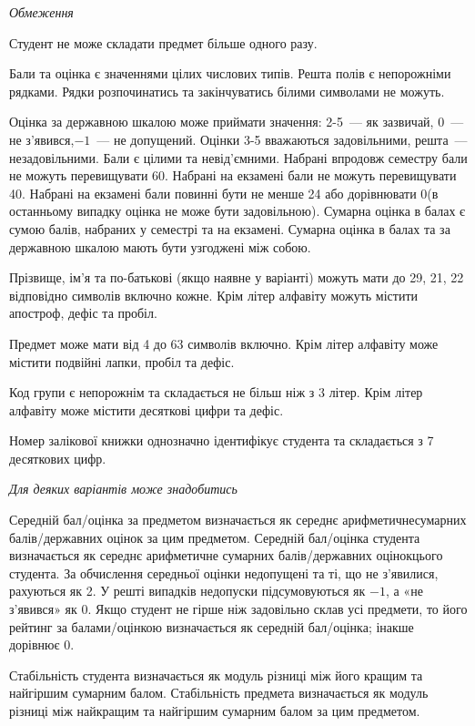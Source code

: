 \documentclass[11pt, ukrainian]{article}
\begin{document}
\bigskip\textit{Обмеження}

Студент не може складати предмет більше одного разу.

Бали та оцінка є значеннями цілих числових типів. Решта полів є непорожніми рядками.
Рядки розпочинатись та закінчуватись білими символами не можуть.

Оцінка за державною шкалою може приймати значення: 2-5~--- як зазвичай, 0~--- не з’явився,$-1$~--- не допущений. 
Оцінки 3-5 вважаються задовільними, решта~--- незадовільними. 
Бали є цілими та невід’ємними.
Набрані впродовж семестру бали не можуть перевищувати 60. 
Набрані на екзамені бали не можуть перевищувати 40. 
Набрані на екзамені бали повинні бути не менше 24 або дорівнювати 0(в останньому випадку оцінка не може бути задовільною). 
Сумарна оцінка в балах є сумою балів, набраних у семестрі та на екзамені.
Сумарна оцінка в балах та за державною шкалою мають бути узгоджені між собою.

Прізвище, ім’я та по-батькові (якщо наявне у варіанті) можуть мати до 29, 21, 22 відповідно символів включно кожне. 
Крім літер алфавіту можуть містити апостроф, дефіс та пробіл.

Предмет може мати від 4 до 63 символів включно. 
Крім літер алфавіту може містити подвійні лапки, пробіл та дефіс.

Код групи є непорожнім та складається не більш ніж з 3 літер. 
Крім літер алфавіту може містити десяткові цифри та дефіс.


Номер залікової книжки однозначно ідентифікує студента та складається з 7 десяткових цифр. 

\bigskip\textit{Для деяких варіантів може знадобитись}

Середній бал/оцінка за предметом визначається як середнє арифметичнесумарних балів/державних оцінок за цим предметом. 
Середній бал/оцінка студента визначається як середнє арифметичне сумарних балів/державних оцінокцього студента. 
За обчислення середньої оцінки недопущені та ті, що не з’явилися, рахуються як 2.
У решті випадків недопуски підсумовуються як $-1$, а «не з’явився» як 0.
Якщо студент не гірше ніж задовільно склав усі предмети, 
то його рейтинг за балами/оцінкою визначається як середній бал/оцінка; інакше дорівнює 0.

Стабільність студента визначається як модуль різниці між його кращим та найгіршим сумарним балом.
Стабільність предмета визначається як модуль різниці між найкращим та найгіршим сумарним балом за цим предметом.
\end{document}
